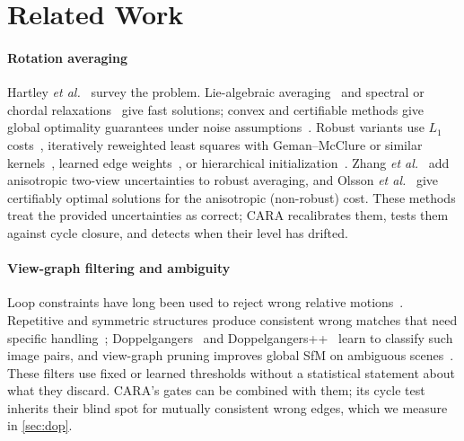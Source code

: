 \section{Related Work}\label{sec:related}

\paragraph*{Rotation averaging} Hartley \emph{et al.}~\cite{hartley2013rotation} survey the problem. Lie-algebraic averaging~\cite{govindu2004lie} and spectral or chordal relaxations~\cite{martinec2007robust} give fast solutions; convex and certifiable methods give global optimality guarantees under noise assumptions~\cite{eriksson2018rotation,rosen2019sesync,dellaert2020shonan}. Robust variants use $L_1$ costs~\cite{hartley2011l1,chatterjee2013efficient}, iteratively reweighted least squares with Geman--McClure or similar kernels~\cite{chatterjee2018robust,geman1987statistical}, learned edge weights~\cite{purkait2020neurora,sidhartha2021weights}, or hierarchical initialization~\cite{lee2022hara}. Zhang \emph{et al.}~\cite{zhang2023revisiting} add anisotropic two-view uncertainties to robust averaging, and Olsson \emph{et al.}~\cite{olsson2025certifiably} give certifiably optimal solutions for the anisotropic (non-robust) cost. These methods treat the provided uncertainties as correct; CARA recalibrates them, tests them against cycle closure, and detects when their level has drifted.

\paragraph*{View-graph filtering and ambiguity} Loop constraints have long been used to reject wrong relative motions~\cite{zach2010disambiguating,enqvist2011nonsequential,moulon2013global}. Repetitive and symmetric structures produce consistent wrong matches that need specific handling~\cite{heinly2014correcting}; Doppelgangers~\cite{cai2023doppelgangers} and Doppelgangers++~\cite{xiangli2025doppelgangerspp} learn to classify such image pairs, and view-graph pruning improves global SfM on ambiguous scenes~\cite{xu2026pruning}. These filters use fixed or learned thresholds without a statistical statement about what they discard. CARA's gates can be combined with them; its cycle test inherits their blind spot for mutually consistent wrong edges, which we measure in \cref{sec:dop}.

